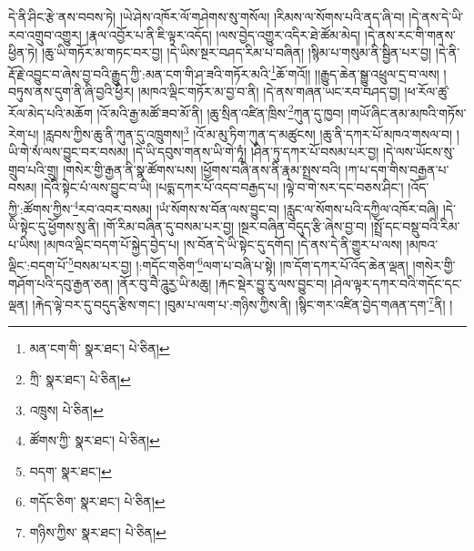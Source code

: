 དེ་ནི་ཤིང་རྩེ་ནས་བབས་ཏེ། །ཡེ་ཤེས་འཁོར་ལོ་གཤེགས་སུ་གསོལ། །རིམས་ལ་སོགས་པའི་ནད་ཞི་བ། །དེ་ནས་དེ་ཡི་རབ་འགྲུབ་འགྱུར། །རྣལ་འབྱོར་པ་ནི་ཇི་ལྟར་འདོད། །ལས་བྱེད་འགྱུར་འདིར་ཐེ་ཚོམ་མེད། །དེ་ནས་རང་གི་གནས་ཕྱིན་ཏེ། །ཆུ་ཡི་གཏོར་མ་གཏང་བར་བྱ། །དེ་ཡིས་སྔར་བཤད་རིམ་པ་བཞིན། །སྙིམ་པ་གསུམ་ནི་སྦྱིན་པར་བྱ། །དེ་ནི་རྡོ་རྗེ་འབྱུང་བ་ཞེས་བྱ་བའི་རྒྱུད་ཀྱི་:མན་ངག་གི་ཤ་ཟའི་གཏོར་མའི་\footnote{མན་ངག་གི་  སྣར་ཐང་།  པེ་ཅིན། }ཆོ་གའོ།། །།རྒྱུད་ཆེན་སྒྱུ་འཕྲུལ་དྲ་བ་ལས། །བཏུས་ནས་དུག་ནི་ཞི་བྱའི་ཕྱིར། །མཁའ་ལྡིང་གཏོར་མ་བྱ་བ་ནི། །དེ་ནས་གཞན་ཡང་རབ་བཤད་བྱ། །ཕ་རོལ་ཚུ་རོལ་མེད་པའི་མཆོག །འོ་མའི་རྒྱ་མཚོ་ཟབ་མོ་ནི། །ཆུ་སྲིན་འཛིན་ཁྲིས་\footnote{ཀྲི་  སྣར་ཐང་།  པེ་ཅིན། }ཀུན་དུ་ཁྱབ། །གཡོ་ཞིང་ནམ་མཁའི་གཏོས་རེག་པ། །རླབས་ཀྱིས་ཆུ་ནི་ཀུན་དུ་འཁྲུགས།\footnote{འཁྲུས།  པེ་ཅིན། } །འོ་མ་མུ་ཏིག་ཀུན་ད་མཚུངས། །ཆུ་ནི་དཀར་པོ་མཁའ་གསལ་བ། །ཡི་གེ་སཾ་ལས་བྱུང་བར་བསམ། །དེ་ཡི་དབུས་གནས་ཡི་གེ་ཏཱཾ། །ཤིན་ཏུ་དཀར་པོ་བསམ་པར་བྱ། །དེ་ལས་ཡོངས་སུ་གྲུབ་པའི་གྲུ། །གསེར་གྱི་རྒྱན་ནི་སྣ་ཚོགས་པས། །ཕྱོགས་བཞི་ནས་ནི་རྣམ་སྤྲས་བའི། །ཀ་པ་དག་གིས་བརྒྱན་པ་བསམ། །དེའི་སྟེང་པཾ་ལས་བྱུང་བ་ཡི། །པདྨ་དཀར་པོ་འདབ་བརྒྱད་པ། །ལྟེ་བ་གེ་སར་དང་བཅས་ཤིང་། །འོད་ཀྱི་:ཚོགས་ཀྱིས་\footnote{ཚོགས་ཀྱི་  སྣར་ཐང་།  པེ་ཅིན། }རབ་འབར་བསམ། །ཡཾ་སོགས་ས་བོན་ལས་བྱུང་བ། །རླུང་ལ་སོགས་པའི་དཀྱིལ་འཁོར་བཞི། །དེ་ཡི་སྟེང་དུ་ཕྱོགས་སུ་ནི། །གོ་རིམ་བཞིན་དུ་བསམ་པར་བྱ། །སྔར་བཞིན་བདུད་རྩི་ཞེས་བྱ་བ། །སྤྲོ་དང་བསྡུ་བའི་རིམ་པ་ཡིས། །མཁའ་ལྡིང་བདག་པོ་སྐྱེད་བྱེད་པ། །ས་བོན་དེ་ཡི་སྟེང་དུ་དགོད། །དེ་ནས་དེ་ནི་གྱུར་པ་ལས། །མཁའ་ལྡིང་:བདག་པོ་\footnote{བདག་  སྣར་ཐང་། }བསམ་པར་བྱ། །:གདོང་གཅིག་\footnote{གདོང་ཅིག་  སྣར་ཐང་།  པེ་ཅིན། }ལག་པ་བཞི་པ་སྟེ། །ཁ་དོག་དཀར་པོ་འོད་ཆེན་ལྡན། །གསེར་གྱི་གཤོག་པའི་དབུ་རྒྱན་ཅན། །ནོར་བུ་བཻ་ཌཱུརྱ་ཡི་མཆུ། །རྐང་སྡེར་བྱུ་རུ་ལས་བྱུང་བ། །ཤེལ་ལྟར་དཀར་བའི་གདོང་དང་ལྡན། །རྐེད་ལྟེ་བར་དུ་བདུད་རྩིས་གང་། །བུམ་པ་ལག་པ་:གཉིས་ཀྱིས་ནི། །སྙིང་གར་འཛིན་བྱེད་གཞན་དག་\footnote{གཉིས་ཀྱིས་  སྣར་ཐང་།  པེ་ཅིན། }ནི། །
